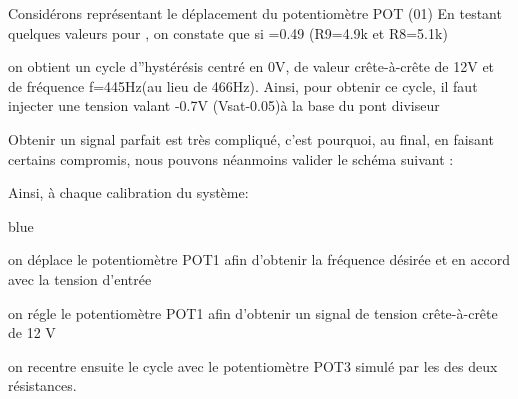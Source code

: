 Considérons représentant le déplacement du potentiomètre POT (01)
En testant quelques valeurs pour , on constate que si =0.49 (R9=4.9k et R8=5.1k)


on obtient un cycle d”hystérésis centré en 0V, de valeur crête-à-crête de 12V et de fréquence f=445Hz(au lieu de 466Hz).
Ainsi, pour obtenir ce cycle, il faut injecter une tension valant -0.7V (Vsat-0.05)à la base du pont diviseur

Obtenir un signal parfait est très compliqué, c’est pourquoi, au final, en faisant certains compromis, nous pouvons néanmoins valider le schéma suivant :





Ainsi, à chaque calibration du système: 
\begin{items}{blue}{\Bullet}
\item on déplace le potentiomètre POT1 afin d’obtenir la fréquence désirée et en accord avec la tension d’entrée
\item on régle le potentiomètre POT1 afin d’obtenir un signal de tension crête-à-crête de 12 V
\item on recentre ensuite le cycle avec le potentiomètre POT3 simulé par les des deux résistances.
\end{items}